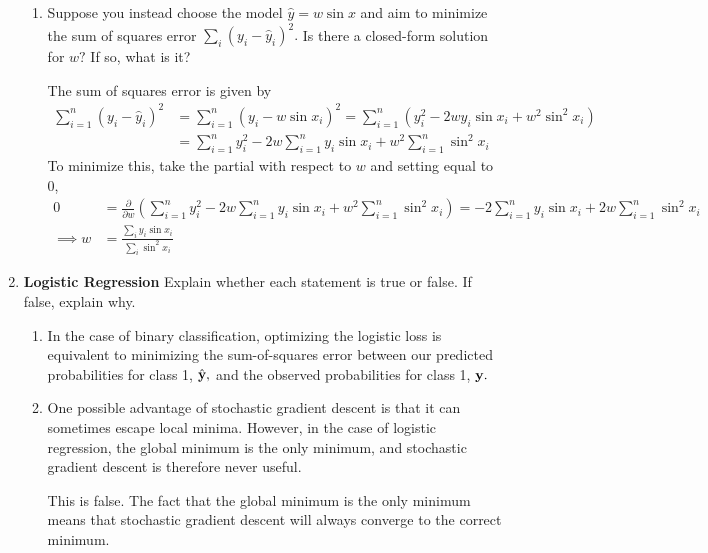 \documentclass{article}
\begin{document}
\begin{enumerate}[1)]
\begin{enumerate}[1.]
			\item Suppose you instead choose the model $\hat y=w\sin x$ and aim to minimize the sum of squares error $\sum_{i}^{}(y_i-\hat y_i)^2.$ Is there a closed-form solution for $w?$ If so, what is it?
				\begin{soln}
					The sum of squares error is given by
					\begin{align*}
						\sum_{i=1}^{n} (y_i-\hat y_i)^2 &= \sum_{i=1}^{n} (y_i-w\sin x_i)^2 = \sum_{i=1}^{n} (y_i^2-2wy_i\sin x_i+w^2\sin^2x_i) \\
						&= \sum_{i=1}^{n} y_i^2 - 2w\sum_{i=1}^{n} y_i\sin x_i + w^2\sum_{i=1}^{n} \sin^2x_i
					\end{align*}
					To minimize this, take the partial with respect to $w$ and setting equal to 0,
					\begin{align*}
						0 &= \frac{\partial}{\partial w} \left( \sum_{i=1}^{n} y_i^2 - 2w\sum_{i=1}^{n} y_i\sin x_i  + w^2\sum_{i=1}^{n} \sin^2x_i\right) = -2\sum_{i=1}^{n} y_i\sin x_i + 2w\sum_{i=1}^{n} \sin^2 x_i \\
						\implies w &= \frac{\sum_{i}^{}y_i\sin x_i}{\sum_{i}^{}\sin^2x_i}
					\end{align*}
				\end{soln}
				
		\end{enumerate}

	\item \textbf{Logistic Regression} Explain whether each statement is true or false. If false, explain why.
		\begin{enumerate}[1.]
			\item In the case of binary classification, optimizing the logistic loss is equivalent to minimizing the sum-of-squares error between our predicted probabilities for class 1, $\hat{\bf y},$ and the observed probabilities for class 1, $\bf y.$

			\item One possible advantage of stochastic gradient descent is that it can sometimes escape local minima. However, in the case of logistic regression, the global minimum is the only minimum, and stochastic gradient descent is therefore never useful.
				\begin{answer*}
					This is false. The fact that the global minimum is the only minimum means that stochastic gradient descent will always converge to the correct minimum.
				\end{answer*}
				
		\end{enumerate}
		
\end{enumerate}
\end{document}
